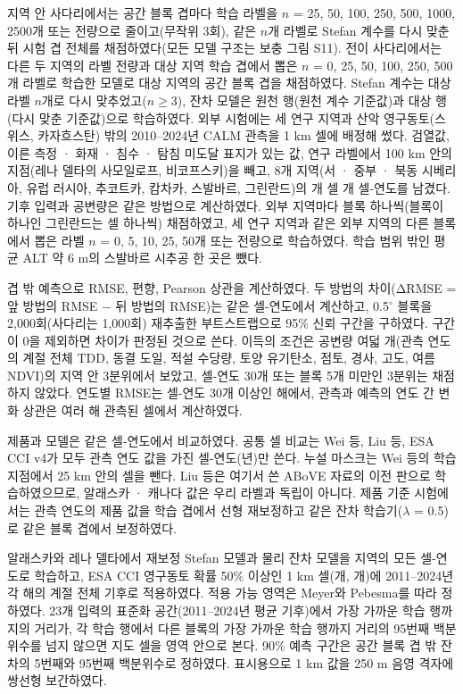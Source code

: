 지역 안 사다리에서는 공간 블록 겹마다 학습 라벨을 $n$ = 25, 50, 100, 250, 500, 1000, 2500개 또는 전량으로 줄이고(무작위 3회), 같은 $n$개 라벨로 Stefan 계수를 다시 맞춘 뒤 시험 겹 전체를 채점하였다(모든 모델 구조는 보충 그림 S11). 전이 사다리에서는 다른 두 지역의 라벨 전량과 대상 지역 학습 겹에서 뽑은 $n$ = 0, 25, 50, 100, 250, 500개 라벨로 학습한 모델로 대상 지역의 공간 블록 겹을 채점하였다. Stefan 계수는 대상 라벨 $n$개로 다시 맞추었고($n \geq 3$), 잔차 모델은 원천 행(원천 계수 기준값)과 대상 행(다시 맞춘 기준값)으로 학습하였다. 외부 시험에는 세 연구 지역과 산악 영구동토(스위스, 카자흐스탄) 밖의 2010--2024년 CALM 관측\cite{Streletskiy2025}을 1 km 셀에 배정해 썼다. 검열값, 이른 측정 · 화재 · 침수 · 탐침 미도달 표지가 있는 값, 연구 라벨에서 100 km 안의 지점(레나 델타의 사모일로프, 비코프스키)을 빼고, 8개 지역(서 · 중부 · 북동 시베리아, 유럽 러시아, 추코트카, 캄차카, 스발바르, 그린란드)의 \nextcells{}개 셀 \nextcy{}개 셀-연도를 남겼다. 기후 입력과 공변량은 같은 방법으로 계산하였다. 외부 지역마다 블록 하나씩(블록이 하나인 그린란드는 셀 하나씩) 채점하였고, 세 연구 지역과 같은 외부 지역의 다른 블록에서 뽑은 라벨 $n$ = 0, 5, 10, 25, 50개 또는 전량으로 학습하였다. 학습 범위 밖인 평균 ALT 약 6 m의 스발바르 시추공 한 곳은 뺐다.

겹 밖 예측으로 RMSE, 편향, Pearson 상관을 계산하였다. 두 방법의 차이(ΔRMSE = 앞 방법의 RMSE − 뒤 방법의 RMSE)는 같은 셀-연도에서 계산하고, 0.5$^\circ$ 블록을 2,000회(사다리는 1,000회) 재추출한 부트스트랩으로 95\% 신뢰 구간을 구하였다. 구간이 0을 제외하면 차이가 판정된 것으로 쓴다. 이득의 조건은 공변량 여덟 개(관측 연도의 계절 전체 TDD, 동결 도일, 적설 수당량, 토양 유기탄소, 점토, 경사, 고도, 여름 NDVI)의 지역 안 3분위에서 보았고, 셀-연도 30개 또는 블록 5개 미만인 3분위는 채점하지 않았다. 연도별 RMSE는 셀-연도 30개 이상인 해에서, 관측과 예측의 연도 간 변화 상관은 여러 해 관측된 셀에서 계산하였다.

제품과 모델은 같은 셀-연도에서 비교하였다. 공통 셀 비교는 Wei 등, Liu 등, ESA CCI v4가 모두 관측 연도 값을 가진 셀-연도(\nyrscc{}년)만 쓴다. 누설 마스크는 Wei 등의 학습 지점에서 25 km 안의 셀을 뺀다. Liu 등은 여기서 쓴 ABoVE 자료의 이전 판으로 학습하였으므로\cite{Liu2024}, 알래스카 · 캐나다 값은 우리 라벨과 독립이 아니다. 제품 기준 시험에서는 관측 연도의 제품 값을 학습 겹에서 선형 재보정하고 같은 잔차 학습기($\lambda$ = 0.5)로 같은 블록 겹에서 보정하였다.

알래스카와 레나 델타에서 재보정 Stefan 모델과 물리 잔차 모델을 지역의 모든 셀-연도로 학습하고, ESA CCI 영구동토 확률 50\% 이상인 1 km 셀(\nncellmapAk{}개, \nncellmapLe{}개)에 2011--2024년 각 해의 계절 전체 기후로 적용하였다. 적용 가능 영역은 Meyer와 Pebesma\cite{MeyerPebesma2021}를 따라 정하였다. 23개 입력의 표준화 공간(2011--2024년 평균 기후)에서 가장 가까운 학습 행까지의 거리가, 각 학습 행에서 다른 블록의 가장 가까운 학습 행까지 거리의 95번째 백분위수를 넘지 않으면 지도 셀을 영역 안으로 본다. 90\% 예측 구간은 공간 블록 겹 밖 잔차의 5번째와 95번째 백분위수로 정하였다. 표시용으로 1 km 값을 250 m 음영 격자에 쌍선형 보간하였다.

